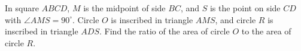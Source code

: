 In square $ABCD$, $M$ is the midpoint of side $BC$, and $S$ is the point on side $CD$ with $\angle AMS=90^\circ$. Circle $O$ is inscribed in triangle $AMS$, and circle $R$ is inscribed in triangle $ADS$. Find the ratio of the area of circle $O$ to the area of circle $R$.
